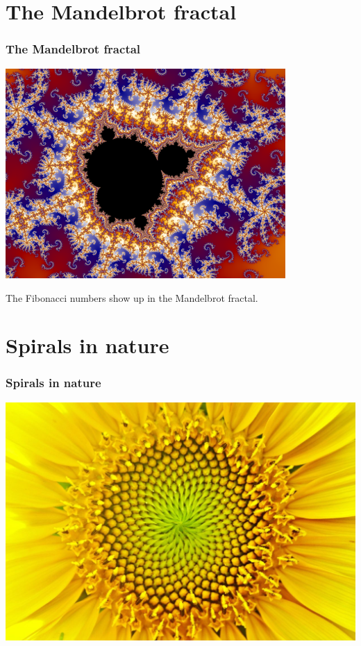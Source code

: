 \documentclass[12pt,compress,english,utf8,t]{beamer}
\begin{document}
\section{The Mandelbrot fractal}

\begin{frame}\frametitle{The Mandelbrot fractal}
  \centering
  \includegraphics[width=0.8\textwidth]{mandelbrot}
  \medskip
  \pause

  The Fibonacci numbers show up in the Mandelbrot fractal.
  \par
\end{frame}



\section{Spirals in nature}

\begin{frame}\frametitle{Spirals in nature}
  \centering
  \includegraphics[height=0.8\textheight]{sonnenblume2}
  \par
\end{frame}
\end{document}
